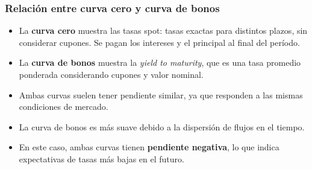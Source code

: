 \documentclass{beamer}
\newif\ifpresentacion
\newcommand{\pausa}{\ifpresentacion\pause\fi}
\begin{document}
\begin{frame}
  \frametitle{Relación entre curva cero y curva de bonos}

  \begin{itemize}
    \pausa
    \item La \textbf{curva cero} muestra las tasas spot: tasas exactas para distintos plazos, sin considerar 
    cupones. Se pagan los intereses y el principal al final del período.
    \pausa
    \item La \textbf{curva de bonos} muestra la \textit{yield to maturity}, que es una tasa promedio ponderada considerando cupones y valor nominal.
    \pausa
    \item Ambas curvas suelen tener pendiente similar, ya que responden a las mismas condiciones de mercado.
    \pausa
    \item La curva de bonos es más suave debido a la dispersión de flujos en el tiempo.
    \pausa
    \item En este caso, ambas curvas tienen \textbf{pendiente negativa}, lo que indica expectativas de tasas más bajas en el futuro.
    \pausa
  \end{itemize}

  \vspace{1em}
\end{frame}
\end{document}
